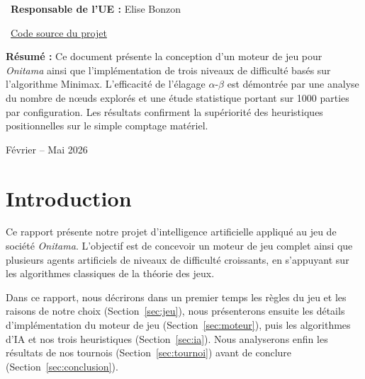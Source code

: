 \documentclass[12pt, a4paper]{article}
\begin{document}
\begin{titlepage}
{\normalsize 
\faChalkboardTeacher\ \textbf{Responsable de l'UE :} Elise Bonzon
}

\vspace{0.5cm}

\faGithub\ 
\href{https://github.com/Amine-Zerouali/onitama-minimax-explorer}
{\color{accent}Code source du projet}

\vfill

\begin{minipage}{0.85\textwidth}
\small
\centering
\textbf{\textcolor{main}{Résumé :}}
Ce document présente la conception d’un moteur de jeu pour \textit{Onitama} ainsi que l'implémentation de trois niveaux de difficulté basés sur l'algorithme Minimax. L’efficacité de l’élagage $\alpha\text{-}\beta$ est démontrée par une analyse du nombre de nœuds explorés et une étude statistique portant sur 1000 parties par configuration. Les résultats confirment la supériorité des heuristiques positionnelles sur le simple comptage matériel.
\end{minipage}

\vspace{1cm}

{\small Février -- Mai 2026}

\end{titlepage}

\newpage
\begingroup
{}
\tableofcontents
\endgroup
\newpage
\newpage

\section{Introduction}

Ce rapport présente notre projet d'intelligence artificielle appliqué au jeu de société
\textit{Onitama}. L'objectif est de concevoir un moteur de jeu complet ainsi que plusieurs agents
artificiels de niveaux de difficulté croissants, en s'appuyant sur les algorithmes classiques
de la théorie des jeux.

Dans ce rapport, nous décrirons dans un premier temps les règles du jeu et les raisons de
notre choix (Section~\ref{sec:jeu}), nous présenterons ensuite les détails d'implémentation du
moteur de jeu (Section~\ref{sec:moteur}), puis les algorithmes d'IA et nos trois heuristiques
(Section~\ref{sec:ia}). Nous analyserons enfin les résultats de nos tournois (Section~\ref{sec:tournoi})
avant de conclure (Section~\ref{sec:conclusion}).
\end{document}
